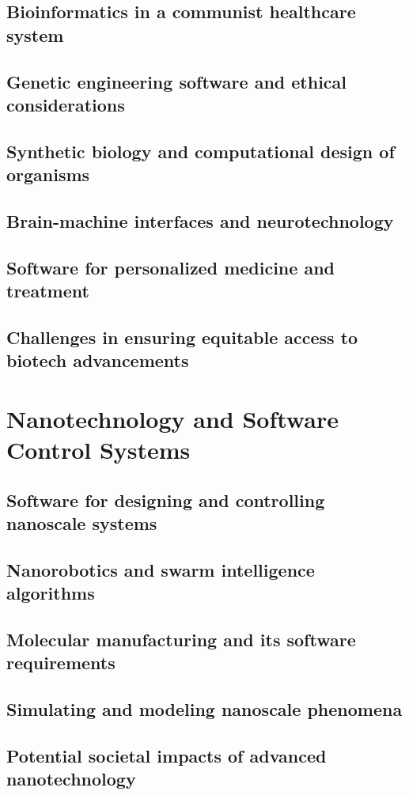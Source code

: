 \subsection{Bioinformatics in a communist healthcare system}
\subsection{Genetic engineering software and ethical considerations}
\subsection{Synthetic biology and computational design of organisms}
\subsection{Brain-machine interfaces and neurotechnology}
\subsection{Software for personalized medicine and treatment}
\subsection{Challenges in ensuring equitable access to biotech advancements}

\newpage

\section{Nanotechnology and Software Control Systems}
\subsection{Software for designing and controlling nanoscale systems}
\subsection{Nanorobotics and swarm intelligence algorithms}
\subsection{Molecular manufacturing and its software requirements}
\subsection{Simulating and modeling nanoscale phenomena}
\subsection{Potential societal impacts of advanced nanotechnology}
